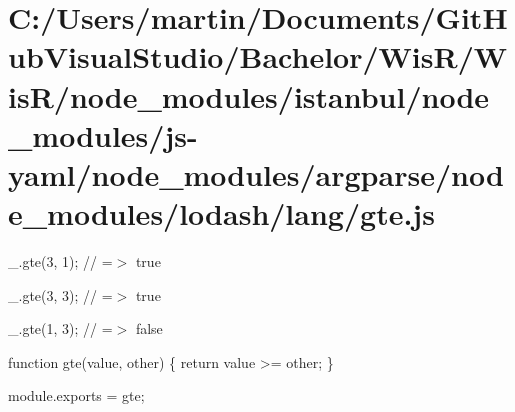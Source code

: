 \hypertarget{_c_1_2_users_2martin_2_documents_2_git_hub_visual_studio_2_bachelor_2_wis_r_2_wis_r_2node_modulef5abe034b9ab1fcf26552468791610d6}{}\section{C\+:/\+Users/martin/\+Documents/\+Git\+Hub\+Visual\+Studio/\+Bachelor/\+Wis\+R/\+Wis\+R/node\+\_\+modules/istanbul/node\+\_\+modules/js-\/yaml/node\+\_\+modules/argparse/node\+\_\+modules/lodash/lang/gte.\+js}
\+\_\+.\+gte(3, 1); // =$>$ true

\+\_\+.\+gte(3, 3); // =$>$ true

\+\_\+.\+gte(1, 3); // =$>$ false


\begin{DoxyCodeInclude}

\textcolor{keyword}{function} gte(value, other) \{
  \textcolor{keywordflow}{return} value >= other;
\}

module.exports = gte;
\end{DoxyCodeInclude}
 